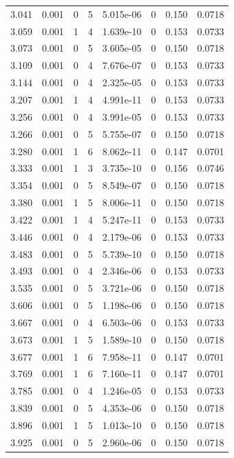 \documentclass[preview]{standalone}
\begin{document}
{{{\begin{tabular}{L{1.2cm}C{1.2cm} C{0.3cm}C{0.5cm} C{1.4cm}C{1.4cm} C{1.4cm}C{1.4cm}}
  3.041  &  0.001  & 0     &  5 &  5.015e-06  & 0  & 0.150 &  0.0718   \\ 
  3.059  &  0.001  & 1     &  4 &  1.639e-10  & 0  & 0.153 &  0.0733   \\ 
  3.073  &  0.001  & 0     &  5 &  3.605e-05  & 0  & 0.150 &  0.0718   \\ 
  3.109  &  0.001  & 0     &  4 &  7.676e-07  & 0  & 0.153 &  0.0733   \\ 
  3.144  &  0.001  & 0     &  4 &  2.325e-05  & 0  & 0.153 &  0.0733   \\ 
  3.207  &  0.001  & 1     &  4 &  4.991e-11  & 0  & 0.153 &  0.0733   \\ 
  3.256  &  0.001  & 0     &  4 &  3.991e-05  & 0  & 0.153 &  0.0733   \\ 
  3.266  &  0.001  & 0     &  5 &  5.755e-07  & 0  & 0.150 &  0.0718   \\ 
  3.280  &  0.001  & 1     &  6 &  8.062e-11  & 0  & 0.147 &  0.0701   \\ 
  3.333  &  0.001  & 1     &  3 &  3.735e-10  & 0  & 0.156 &  0.0746   \\ 
  3.354  &  0.001  & 0     &  5 &  8.549e-07  & 0  & 0.150 &  0.0718   \\ 
  3.380  &  0.001  & 1     &  5 &  8.006e-11  & 0  & 0.150 &  0.0718   \\ 
  3.422  &  0.001  & 1     &  4 &  5.247e-11  & 0  & 0.153 &  0.0733   \\ 
  3.446  &  0.001  & 0     &  4 &  2.179e-06  & 0  & 0.153 &  0.0733   \\ 
  3.483  &  0.001  & 0     &  5 &  5.739e-10  & 0  & 0.150 &  0.0718   \\ 
  3.493  &  0.001  & 0     &  4 &  2.346e-06  & 0  & 0.153 &  0.0733   \\ 
  3.535  &  0.001  & 0     &  5 &  3.721e-06  & 0  & 0.150 &  0.0718   \\ 
  3.606  &  0.001  & 0     &  5 &  1.198e-06  & 0  & 0.150 &  0.0718   \\ 
  3.667  &  0.001  & 0     &  4 &  6.503e-06  & 0  & 0.153 &  0.0733   \\ 
  3.673  &  0.001  & 1     &  5 &  1.589e-10  & 0  & 0.150 &  0.0718   \\ 
  3.677  &  0.001  & 1     &  6 &  7.958e-11  & 0  & 0.147 &  0.0701   \\ 
  3.769  &  0.001  & 1     &  6 &  7.160e-11  & 0  & 0.147 &  0.0701   \\ 
  3.785  &  0.001  & 0     &  4 &  1.246e-05  & 0  & 0.153 &  0.0733   \\ 
  3.839  &  0.001  & 0     &  5 &  4.353e-06  & 0  & 0.150 &  0.0718   \\ 
  3.896  &  0.001  & 1     &  5 &  1.013e-10  & 0  & 0.150 &  0.0718   \\ 
  3.925  &  0.001  & 0     &  5 &  2.960e-06  & 0  & 0.150 &  0.0718   \\ 
\hline 
\end{tabular} 

}}}
\end{document}
